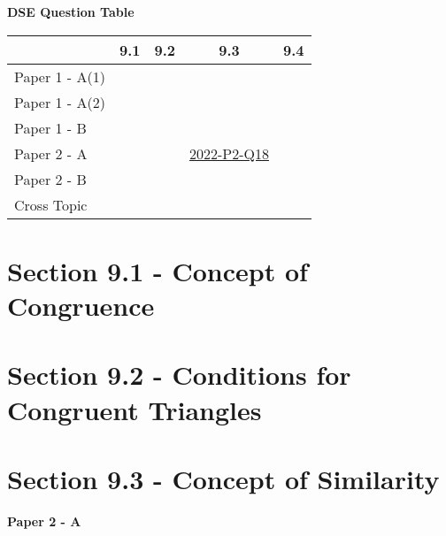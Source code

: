 \documentclass[12pt, a4paper]{article}
\begin{document}
\begin{absolutelynopagebreak}
\begin{center}
\textbf{DSE Question Table}
\end{center}
\begin{center}
\begin{tabular}{|l|c|c|c|c|}
\hline
        & 9.1 & 9.2 & 9.3 & 9.4 \\\hline
\hline
Paper 1 - A(1)&  &  &  &  \\
\hline
Paper 1 - A(2)&  &  &  &  \\
\hline
Paper 1 - B&  &  &  &  \\
\hline
\hline
Paper 2 - A&  &  & \hyperref[DSE2022-CoreP2-Q18]{2022-P2-Q18} &  \\
\hline
Paper 2 - B&  &  &  &  \\
\hline
\hline
Cross Topic&  &  &  &  \\
\hline
\end{tabular}
\end{center}
\end{absolutelynopagebreak}




\section*{Section 9.1 - Concept of Congruence}\label{section:1-9-1}





\section*{Section 9.2 - Conditions for Congruent Triangles}\label{section:1-9-2}





\section*{Section 9.3 - Concept of Similarity}\label{section:1-9-3}

\textbf{Paper 2 - A}
\begin{enumx}[label=\arabic*.,start=1]
\item {}\label{DSE2022-CoreP2-Q18} 
\end{enumx}
\end{document}
